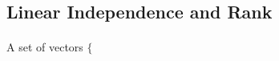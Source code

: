 \documentclass[../../main.tex]{subfiles}
\begin{document}
\subsection{Linear Independence and Rank}


\paragraph{ }

A set of vectors $\{ $
\end{document}
